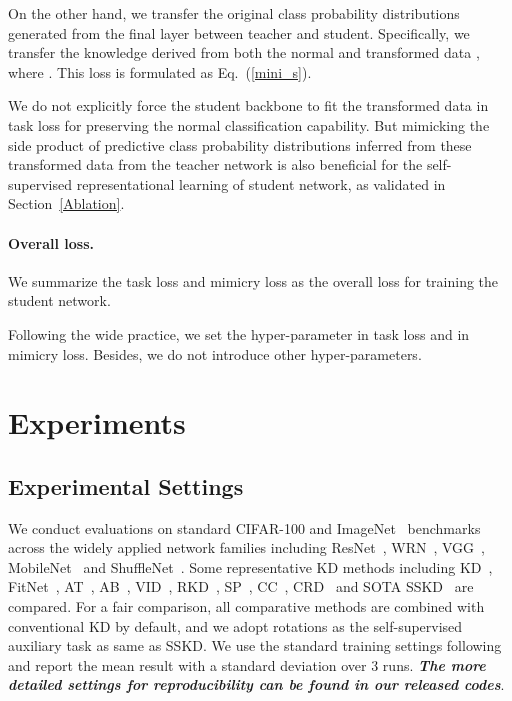 \documentclass{article}
\begin{document}
On the other hand, we transfer the original class probability distributions generated from the final layer between teacher and student. Specifically, we transfer the knowledge derived from both the normal and transformed data , where . This loss is formulated as Eq.~(\ref{mini_s}). 

We do not explicitly force the student backbone  to fit the transformed data in task loss for preserving the normal classification capability. But mimicking the side product of predictive class probability distributions inferred from these transformed data from the teacher network is also beneficial for the self-supervised representational learning of student network, as validated in Section~\ref{Ablation}.

\paragraph{Overall loss.} We summarize the task loss and  mimicry loss as the overall loss  for training the student network.

Following the wide practice, we set the hyper-parameter  in task loss and  in mimicry loss. Besides, we do not introduce other hyper-parameters.

\section{Experiments}
\subsection{Experimental Settings}
We conduct evaluations on standard CIFAR-100 and ImageNet~\cite{deng2009imagenet} benchmarks across the widely applied network families including ResNet~\cite{he2016deep}, WRN~\cite{zagoruyko2016wide}, VGG~\cite{simonyan2014very}, MobileNet~\cite{sandler2018mobilenetv2} and ShuffleNet~\cite{zhang2018shufflenet,ma2018shufflenet}. Some representative KD methods including KD~\cite{hinton2015distilling}, FitNet~\cite{romero2014fitnets}, AT~\cite{zagoruyko2016paying}, AB~\cite{heo2019knowledge}, VID~\cite{Sungsoo19Variational}, RKD~\cite{park2019relational}, SP~\cite{Tung2019Similarity}, CC~\cite{peng2019correlation}, CRD~\cite{tian2019contrastive} and SOTA SSKD~\cite{DBLP:conf/eccv/XuLLL20} are compared. For a fair comparison, all comparative methods are combined with conventional KD by default, and we adopt rotations  as the self-supervised auxiliary task as same as SSKD. We use the standard training settings following~\cite{DBLP:conf/eccv/XuLLL20} and report the mean result with a standard deviation over 3 runs. \textbf{\emph{The more detailed settings for reproducibility can be found in our released codes}}.
\end{document}
